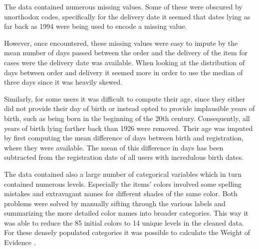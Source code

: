 
The data contained numerous missing values. Some of these were obscured by unorthodox codes, specifically for the delivery date it seemed that dates lying as far back as 1994 were being used to encode a missing value. 

However, once encountered, these missing values were easy to impute by the mean number of days passed between the order and the delivery of the item for cases were the delivery date was available. When looking at the distribution of days between order and delivery it seemed more in order to use the median of three days since it was heavily skewed.

Similarly, for some users it was difficult to compute their age, since they either did not provide their day of birth or instead opted to provide implausible years of birth, such as being born in the beginning of the 20th century. Consequently, all years of birth lying farther back than 1926 were removed. Their age was imputed by first computing the mean difference of days between birth and registration, where they were available. The mean of this difference in days has been subtracted from the registration date of all users with incredulous birth dates.

The data contained also a large number of categorical variables which in turn contained numerous levels. Especially the items' colors involved some spelling mistakes and extravagant names for different shades of the same color. Both problems were solved by manually sifting through the various labels and summarizing the more detailed color names into broader categories. This way it was able to reduce the 85 initial colors to 14 unique levels in the cleaned data. For these densely populated categories it was possible to calculate the Weight of Evidence \cite{woe}.

